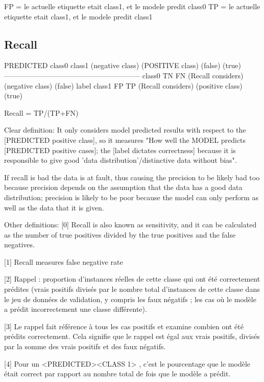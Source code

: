 \documentclass[11pt, onecolumn]{article}
\begin{document}
FP = le actuelle etiquette etait class1, et le modele predit class0
TP = le actuelle etiquette etait class1, et le modele predit class1





\subsection{Recall}

				PREDICTED
			class0		class1 
        	    (negative class)   (POSITIVE class)
        	       (false)            (true)
	---------------------------------------------------------
	class0		TN		FN (Recall considers)
   (negative class)
        (false)
label
	class1		FP		TP (Recall considers)
   (positive class)
        (true)
        
        
Recall = TP/(TP+FN) 


Clear definition: It only considers model predicted results with respect to the [PREDICTED positive class], so it measures "How well the MODEL predicts [PREDICTED positive cases]; the [label dictates correctness] because it is responsible to give good 'data distribution'/distinctive data without bias". 

If recall is bad the data is at fault, thus causing the precision to be likely bad too because precision depends on the assumption that the data has a good data distribution; precision is likely to be poor because the model can only perform as well as the data that it is given.



Other definitions:
[0] Recall is also known as sensitivity, and it can be calculated as the number of true positives divided by the true positives and the false negatives.

[1] Recall measures false negative rate

[2] Rappel : proportion d’instances réelles de cette classe qui ont été correctement prédites (vrais positifs divisés par le nombre total d’instances de cette classe dans le jeu de données de validation, y compris les faux négatifs ; les cas où le modèle a prédit incorrectement une classe différente).

[3] Le rappel fait référence à tous les cas positifs et examine combien ont été prédits correctement. Cela signifie que le rappel est égal aux vrais positifs, divisés par la somme des vrais positifs et des faux négatifs.

[4] Pour un <PREDICTED><CLASS 1> , c'est le pourcentage que le modèle était correct par rapport au nombre total de fois que le modèle a prédit.
\end{document}
